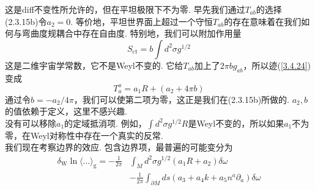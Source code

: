 这是diff不变性所允许的，但在平坦极限下不为零. 早先我们通过$T_{ab}$的选择(2.3.15b)令$a_2=0$. 等价地，平坦世界面上超过一个守恒$T_{ab}$的存在意味着在我们如何与弯曲度规耦合中存在自由度. 特别地，我们可以附加作用量
\begin{equation}
S_{\mathrm{ct}}=b \int d^{2} \sigma g^{1 / 2}
\end{equation}
这是二维宇宙学常数，它不是Weyl不变的. 它给$T_{ab}$加上了$2 \pi b g_{a b}$，所以迹(\ref{3.4.24})变成
\begin{equation}
T_{a}^{a}=a_{1} R+\left(a_{2}+4 \pi b\right)
\end{equation}
通过令$b=-a_{2} / 4 \pi$，我们可以使第二项为零，这正是我们在(2.3.15b)所做的. $a_2,b$的值依赖于定义，这里不感兴趣.\\
没有可以移除$a_1$的定域抵消项. 例如，$\int d^{2} \sigma g^{1 / 2} R$是Weyl不变的，所以如果$a_1$不为零，在Weyl对称性中存在一个真实的反常. \\
我们现在考察边界的效应. 包含边界项，最普遍的可能变分为
\begin{equation}
\begin{aligned}
\delta_{\mathrm{W}} \ln \langle\ldots\rangle_{\mathrm{g}}=-\frac{1}{2 \pi} & \int_{M} d^{2} \sigma g^{1 / 2}\left(a_{1} R+a_{2}\right) \delta \omega \\
&-\frac{1}{2 \pi} \int_{\partial M} d s\left(a_{3}+a_{4} k+a_{5} n^{a} \partial_{a}\right) \delta \omega
\end{aligned}
\end{equation}

